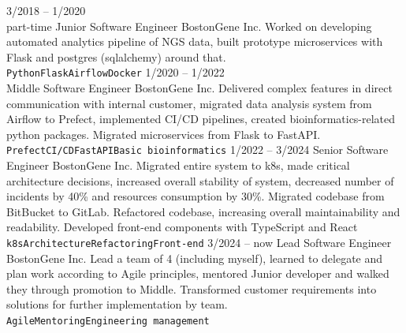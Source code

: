\documentclass[9pt]{developercv} %
\begin{document}



\begin{entrylist}
	\entry
		{3/2018 -- 1/2020 \\ \footnotesize{part-time}}
		{Junior Software Engineer}
		{BostonGene Inc.}
		{Worked on developing automated analytics pipeline of NGS data, built prototype  microservices with Flask and postgres (sqlalchemy) around that.\\ \texttt{Python}\slashsep\texttt{Flask}\slashsep\texttt{Airflow}\slashsep\texttt{Docker}}
	\entry
		{1/2020 -- 1/2022\\}
		{Middle Software Engineer}
		{BostonGene Inc.}
		{Delivered complex features in direct communication with internal customer, migrated data analysis system from Airflow to Prefect, implemented CI/CD pipelines, created bioinformatics-related python packages. Migrated microservices from Flask to FastAPI.\\ \texttt{Prefect}\slashsep\texttt{CI/CD}\slashsep\texttt{FastAPI}\slashsep\texttt{Basic bioinformatics}}
	\entry
		{1/2022 -- 3/2024}
		{Senior Software Engineer}
		{BostonGene Inc.}
		{Migrated entire system to k8s, made critical architecture decisions, increased overall stability of system, decreased number of incidents by 40\% and resources consumption by 30\%. Migrated codebase from BitBucket to GitLab. Refactored codebase, increasing overall maintainability and readability. Developed front-end components with TypeScript and React \\ \texttt{k8s}\slashsep\texttt{Architecture}\slashsep\texttt{Refactoring}\slashsep\texttt{Front-end}}
	\entry
		{3/2024 -- now}
		{Lead Software Engineer}
		{BostonGene Inc.}
		{Lead a team of 4 (including myself), learned to delegate and plan work according to Agile principles, mentored Junior developer and walked they through promotion to Middle. Transformed customer requirements into solutions for further implementation by team. \\ \texttt{Agile}\slashsep\texttt{Mentoring}\slashsep\texttt{Engineering management}}
\end{entrylist}
\end{document}
